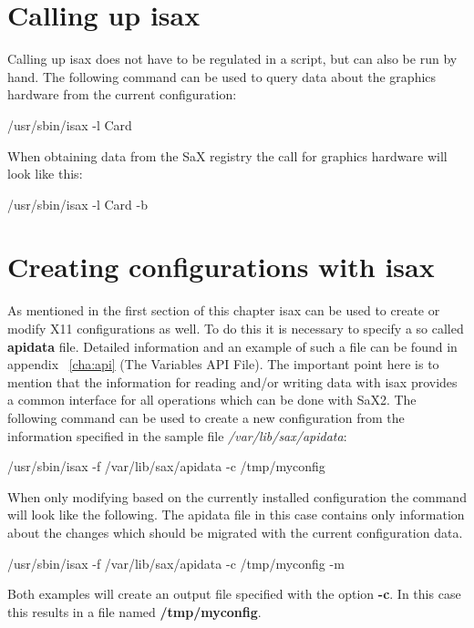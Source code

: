 \section{Calling up isax}
Calling up isax does not have to be regulated in a script, but can also be run
by hand. The following command can be used to query data about the graphics
hardware from the current configuration:

\begin{Command}{5cm}
/usr/sbin/isax -l Card
\end{Command}

When obtaining data from the SaX registry the call for graphics hardware
will look like this:

\begin{Command}{5cm}
/usr/sbin/isax -l Card -b
\end{Command}

\section{Creating configurations with isax}
As mentioned in the first section of this chapter isax can be used
to create or modify X11 configurations as well. To do this it is
necessary to specify a so called \textbf{apidata} file. Detailed
information and an example of such a file can be found in
appendix ~\ref{cha:api} (The Variables API File).
The important point here is to mention
that the information for reading and/or writing data with isax provides
a common interface for all operations which can be done with SaX2.
The following command can be used to create a new configuration
from the information specified in the sample file \textit{/var/lib/sax/apidata}:

\begin{Command}{11cm}
/usr/sbin/isax -f /var/lib/sax/apidata -c /tmp/myconfig
\end{Command}

When only modifying based on the currently installed configuration
the command will look like the following. The apidata file in this case
contains only information about the changes which should be migrated
with the current configuration data.

\begin{Command}{11cm}
/usr/sbin/isax -f /var/lib/sax/apidata -c /tmp/myconfig -m
\end{Command}

Both examples will create an output file specified with the option
\textbf{-c}. In this case this results in a file named
\textbf{/tmp/myconfig}.

